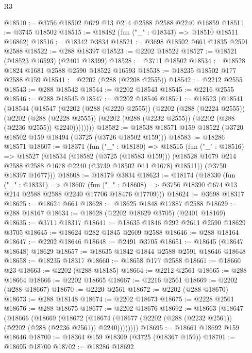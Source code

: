 \begin{lexlean}{R3}
\begin{coremodule}
@18510 := @3756 @18502 @679 @13 @214 @2588 @2588 @2240 @16859
@18511 := @3745 @18502
@18515 := @18482 (fun ("_" : @18343) => @18510 @18511 @16862)
@18516 := @18342 @3834
@18521 := @3698 @18502 @661 @1835 @2591 @2588
@18522 := @288 @18397
@18523 := @2202 @18522
@18527 := @18521 (@18523 @16593) (@2401 @18399)
@18528 := @3711 @18502
@18534 := @18528 @1824 @1681 @2588 @2590 @18522 @16593
@18538 := @18235 @18502 @177 @2588 @159
@18541 := @2202 (@288 (@2208 @2555))
@18542 := @2212 @2555
@18543 := @288 @18542
@18544 := @2202 @18543
@18545 := @2216 @2555
@18546 := @288 @18545
@18547 := @2202 @18546
@18571 := @18523
    (@18541
      (@18544
        (@18547
          (@2202
            (@288 (@2220 @2555))
            (@2202
              (@288 (@2224 @2555))
              (@2202
                (@288 (@2228 @2555))
                (@2202 (@288 (@2232 @2555)) (@2202 (@288 (@2236 @2555)) @2240))))))))
@18582 := @18538 @18571 @159 @18522 (@3720 @18502 @159 @18494 (@3725 (@3726 @18502 @159)))
@18583 := @18286 @18571
@18607 := @18371
    (fun ("_" : @18180) =>
    @18515
      (fun ("_" : @18516) =>
      @18527
        (@18534
          (@18582 (@3725 (@18583 @159)))
          (@18528 @1679 @214 @2588 @2588 @1678 @2240 (@3739 @18502 @11 @1678) @18511))
        (@3750 @18397 @1677)))
@18608 := @18179 @3834
@18623 := @18174
    (@18330
      (fun ("_" : @18331) =>
      @18607
        (fun ("_" : @18608) => @3756 @18390 @674 @13 @214 @2588 @2588 @2240 @17706 @18476 @17709)))
@18624 := @3698 @18317
@18625 := @18624 @661
@18628 := @18625 @1848 @17887 @2588
@18629 := @288 @18167
@18634 := @18628 (@2202 @18629 @3705) (@2401 @18169)
@18635 := @3711 @18317
@18641 := @18635 @1846 @292 @2611 @2590 @18629 @3705
@18645 := @18624 @282 @1845 @2609 @2588
@18646 := @288 @18164
@18647 := @2202 @18646
@18648 := @2491 @3705
@18651 := @18645 (@18647 @18648) @18629
@18657 := @18635 @1842 @1844 @2588 @2591 @18646 @18648
@18658 := @18235 @18317
@18660 := @18658 @177 @2588
@18661 := @18660 @23
@18663 := @2202 (@288 @18185)
@18664 := @2212 @2561
@18665 := @288 @18664
@18666 := @2202 @18665
@18667 := @2216 @2561
@18669 := @2202 (@288 @18667)
@18670 := @2220 @2561
@18672 := @2202 (@288 @18670)
@18673 := @288 @18148
@18674 := @2202 @18673
@18675 := @2228 @2561
@18676 := @288 @18675
@18677 := @2202 @18676
@18692 := @18663
    (@18647
      (@18666
        (@18669
          (@18672
            (@18674 (@18677 (@2202 (@288 (@2232 @2561)) (@2202 (@288 (@2236 @2561)) @2240))))))))
@18695 := @18661 @18692 @159 @18646
@18700 := @18364 @159 @18309 (@3725 (@18367 @159))
@18701 := @18695 @18700
@18702 := @18286 @18692

\end{coremodule}
\end{lexlean}
